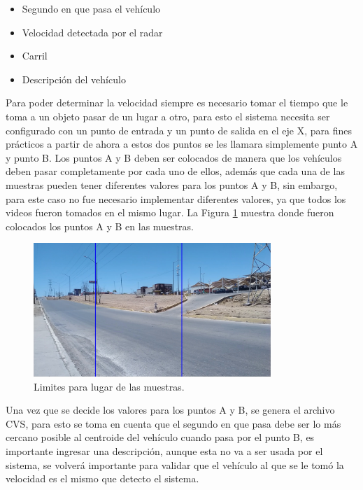\begin{itemize}
    \item Segundo en que pasa el vehículo
    \item Velocidad detectada por el radar
    \item Carril
    \item Descripción del vehículo
\end{itemize}

Para poder determinar la velocidad siempre es necesario tomar el tiempo que le toma a un objeto pasar de un lugar a otro, para esto el sistema necesita ser configurado con un punto de entrada y un punto de salida en el eje X, para fines prácticos a partir de ahora a estos dos puntos se les llamara simplemente punto A y punto B.  Los puntos A y B deben ser colocados de manera que los vehículos deben pasar completamente por cada uno de ellos, además que cada una de las muestras pueden tener diferentes valores para los puntos A y B, sin embargo, para este caso no fue necesario implementar diferentes valores, ya que todos los videos fueron tomados en el mismo lugar. La Figura \ref{fig:LugarLimites} muestra donde fueron colocados los puntos A y B en las muestras.

\begin{figure}[H]
    \centering
    \includegraphics[width=0.8\textwidth]{Metodologia/imgs/LugarLimites.jpg}
    \caption{Limites para lugar de las muestras.}
    \label{fig:LugarLimites}
\end{figure}

Una vez que se decide los valores para los puntos A y B, se genera el archivo CVS, para esto se toma en cuenta que el segundo en que pasa debe ser lo más cercano posible al centroide del vehículo cuando pasa por el punto B, es importante ingresar una descripción, aunque esta no va a ser usada por el sistema, se volverá importante para validar que el vehículo al que se le tomó la velocidad es el mismo que detecto el sistema.

